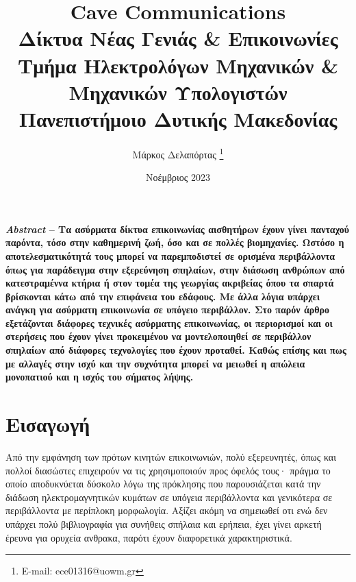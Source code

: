 \documentclass[12pt]{article}
\title{
    \textsf{ Cave Communications}\\
    \textsf{Δίκτυα Νέας Γενιάς \& Επικοινωνίες}\\
    \textsf{\Large Τμήμα Ηλεκτρολόγων Μηχανικών \& Μηχανικών Υπολογιστών}\\
    \textsf{\large Πανεπιστήμοιο Δυτικής Μακεδονίας}
}
\author{\textsf{Μάρκος Δελαπόρτας} \footnote{E-mail: ece01316@uowm.gr}}
\date{\textsf{Νοέμβριος 2023}}
\begin{document}
\maketitle

\begin{multicols*}{2}
    \scriptsize \textbf{ \textit{Abstract} -- Τα ασύρματα δίκτυα επικοινωνίας αισθητήρων έχουν γίνει πανταχού παρόντα, τόσο στην καθημερινή ζωή, όσο και σε
        πολλές βιομηχανίες. Ωστόσο η αποτελεσματικότητά τους μπορεί να παρεμποδιστεί σε ορισμένα περιβάλλοντα όπως για παράδειγμα στην εξερεύνηση σπηλαίων, στην
        διάσωση ανθρώπων από κατεστραμέννα κτήρια ή στον τομέα της γεωργίας ακριβείας όπου τα σπαρτά βρίσκονται κάτω από την επιφάνεια του εδάφους. Με άλλα
        λόγια υπάρχει ανάγκη για ασύρματη επικοινωνία σε υπόγειο περιβάλλον. Στο παρόν άρθρο εξετάζονται διάφορες τεχνικές ασύρματης επικοινωνίας, οι
        περιορισμοί και οι στερήσεις που έχουν γίνει προκειμένου να μοντελοποιηθεί σε περιβάλλον σπηλαίων από διάφορες τεχνολογίες που έχουν προταθεί. Καθώς
        επίσης και πως με αλλαγές στην ισχύ και την συχνότητα μπορεί να μειωθεί η απώλεια μονοπατιού και η ισχύς του σήματος λήψης. }

    \section{\normalsize \textsf{Εισαγωγή}}
        Από την εμφάνηση των πρότων κινητών επικοινωνιών, πολύ εξερευνητές, όπως και πολλοί διασώστες επιχειρούν να τις χρησιμοποιούν προς όφελός τους· πράγμα
        το οποίο αποδυκνύεται δύσκολο λόγω της πρόκλησης που παρουσιάζεται κατά την διάδωση ηλεκτρομαγνητικών κυμάτων σε υπόγεια περιβάλλοντα και γενικότερα σε
        περιβάλλοντα με περίπλοκη μορφωλογία. Αξίζει ακόμη να σημειωθεί οτι ενώ δεν υπάρχει πολύ βιβλιογραφία για συνήθεις σπήλαια και ερήπεια, έχει γίνει
        αρκετή έρευνα για ορυχεία ανθρακα, παρότι έχουν διαφορετικά χαρακτηριστικά.
    

\end{multicols*}
\end{document}
